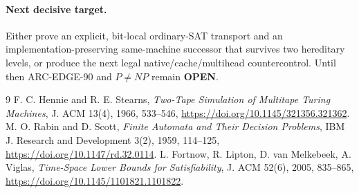 \documentclass[11pt]{article}
\newcommand{\OPEN}{\textbf{OPEN}}
\begin{document}
\paragraph{Next decisive target.}
Either prove an explicit, bit-local ordinary-SAT transport and an implementation-preserving same-machine successor that survives two hereditary levels, or produce the next legal native/cache/multihead countercontrol.  Until then ARC-EDGE-90 and $P\ne NP$ remain \OPEN.

\begin{thebibliography}{9}
 F. C. Hennie and R. E. Stearns, \emph{Two-Tape Simulation of Multitape Turing Machines}, J. ACM 13(4), 1966, 533--546, \url{https://doi.org/10.1145/321356.321362}.
 M. O. Rabin and D. Scott, \emph{Finite Automata and Their Decision Problems}, IBM J. Research and Development 3(2), 1959, 114--125, \url{https://doi.org/10.1147/rd.32.0114}.
 L. Fortnow, R. Lipton, D. van Melkebeek, A. Viglas, \emph{Time-Space Lower Bounds for Satisfiability}, J. ACM 52(6), 2005, 835--865, \url{https://doi.org/10.1145/1101821.1101822}.
\end{thebibliography}
\end{document}
